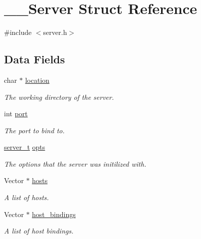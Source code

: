 \hypertarget{struct_____server}{}\section{\+\_\+\+\_\+\+Server Struct Reference}
\label{struct_____server}


{\ttfamily \#include $<$server.\+h$>$}

\subsection*{Data Fields}
\begin{DoxyCompactItemize}
\item 
char $\ast$ \mbox{\hyperlink{struct_____server_a34c1fd64941cff2faede91f79ebee8ec}{location}}
\begin{DoxyCompactList}\small\item\em The working directory of the server. \end{DoxyCompactList}\item 
int \mbox{\hyperlink{struct_____server_a4b1f796c585e0682d0284c210fd98ce3}{port}}
\begin{DoxyCompactList}\small\item\em The port to bind to. \end{DoxyCompactList}\item 
\mbox{\hyperlink{server_8h_ac716a2b0d74f0b48cf81937cb7b3f725}{server\+\_\+t}} \mbox{\hyperlink{struct_____server_a7bedad78c4a7e7dc2045067cb99dc237}{opts}}
\begin{DoxyCompactList}\small\item\em The options that the server was initilized with. \end{DoxyCompactList}\item 
Vector $\ast$ \mbox{\hyperlink{struct_____server_aa3be8ce9854d670e8d998ed3447d95ee}{hosts}}
\begin{DoxyCompactList}\small\item\em A list of hosts. \end{DoxyCompactList}\item 
Vector $\ast$ \mbox{\hyperlink{struct_____server_a389d7a5fe24d9711632aabfed1c37ae3}{host\+\_\+bindings}}
\begin{DoxyCompactList}\small\item\em A list of host bindings. \end{DoxyCompactList}\end{DoxyCompactItemize}



